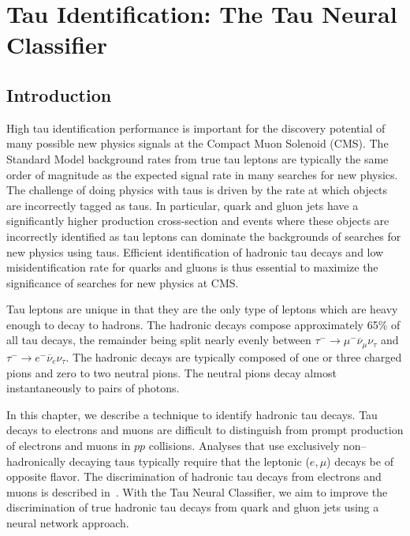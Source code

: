 \ifx\master\undefined\fi

\chapter{Tau Identification: The Tau Neural Classifier}
\label{ch:tanc}

\section{Introduction}

High tau identification performance is important for the discovery potential of
many possible new physics signals at the Compact Muon Solenoid (CMS).  The
Standard Model background rates from true tau leptons are typically the same
order of magnitude as the expected signal rate in many searches for new
physics.  The challenge of doing physics with taus is driven by the rate at
which objects are incorrectly tagged as taus.  In particular, quark and gluon
jets have a significantly higher production cross-section and events where
these objects are incorrectly identified as tau leptons can dominate the
backgrounds of searches for new physics using taus.  Efficient identification
of hadronic tau decays and low misidentification rate for quarks and gluons
is thus essential to maximize the significance of searches for new physics at
CMS.

Tau leptons are unique in that they are the only type of leptons which are heavy
enough to decay to hadrons.  The hadronic decays compose approximately 65\% of
all tau decays, the remainder being split nearly evenly between $\tau^{-} \to
\mu^{-} \overline \nu_\mu \nu_\tau$ and $\tau^{-} \to e^{-} \overline \nu_e \nu_\tau$.
The hadronic decays are typically composed of one or three charged pions and
zero to two neutral pions.  The neutral pions decay almost instantaneously to
pairs of photons.

In this chapter, we describe a technique to identify hadronic tau decays.  Tau
decays to electrons and muons are difficult to distinguish from prompt
production of electrons and
muons in $pp$ collisions.  Analyses that use exclusively
non--hadronically decaying taus typically require that the leptonic ($e,\mu$)
decays be of opposite flavor.  The discrimination of hadronic tau decays from
electrons and muons is described in~\cite{CMS-PAS-PFT-08-001}.  With the Tau Neural
Classifier, we aim to improve the discrimination of true hadronic tau decays
from quark and gluon jets using a neural network approach.

